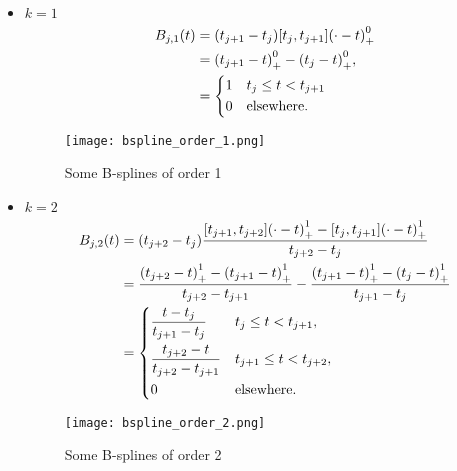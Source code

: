 \begin{example}
  \begin{itemize}
    \item \underline{$k=1$}
      \begin{align*}
        B_{j,1}(t) &= (t_{j+1}-t_j)[t_j, t_{j+1}]{(\cdot-t)}_+^0 \\
	&= {(t_{j+1}-t)}_+^0 - {(t_j-t)}_+^0, \\
	&= \begin{dcases} 1 & t_j \leq t < t_{j+1} \\ 0 & \mathrm{elsewhere}.
	\end{dcases}
      \end{align*}
      \begin{figure}[!h]
	\centering
	\texttt{[image: bspline\_order\_1.png]}
	\caption{Some B-splines of order 1}\label{fig:bspline-order-1}
      \end{figure}
    \item \underline{$k=2$}
      \begin{align*}
        B_{j,2}(t) &= (t_{j+2}-t_j)\frac{[t_{j+1}, t_{j+2}]{(\cdot-t)}_+^1-[t_{j}, 
        t_{j+1}]{(\cdot-t)}_+^1}{t_{j+2}-t_j}\\
        &= \frac{{(t_{j+2}-t)}_+^1-{(t_{j+1}-t)}_+^1}{t_{j+2}-t_{j+1}}- 
        \frac{{(t_{j+1}-t)}_+^1-{(t_{j}-t)}_+^1}{t_{j+1}-t_{j}} \\
        &= 
        \begin{dcases}
	  \frac{t-t_j}{t_{j+1}-t_j} & t_j \leq t < t_{j+1},\\
	  \frac{t_{j+2}-t}{t_{j+2}-t_{j+1}} & t_{j+1} \leq t < t_{j+2}, \\
	0 & \mathrm{elsewhere}.
      \end{dcases}
      \end{align*}
      \begin{figure}[!h]
	\centering
	\texttt{[image: bspline\_order\_2.png]}
	\caption{Some B-splines of order 2}\label{fig:bspline-order-2}
      \end{figure}
  \end{itemize}
\end{example}

